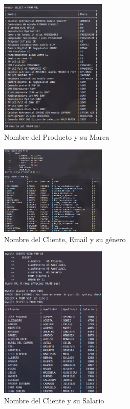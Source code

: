 \documentclass[12pt, fleqn]{article}                             %
\begin{document}
        \begin{figure}[ht!]
            \centering
            \includegraphics[width=0.45\textwidth]{BD5Reporte9}
            \caption{Nombre del Producto y su Marca}
        \end{figure}

        \begin{figure}[ht!]
            \centering
            \includegraphics[width=0.45\textwidth]{BD5Reporte10}
            \caption{Nombre del Cliente, Email y su género}
        \end{figure}

        \begin{figure}[ht!]
            \centering
            \includegraphics[width=0.45\textwidth]{BD5Reporte11}
            \caption{Nombre del Cliente y su Salario}
        \end{figure}
\end{document}

